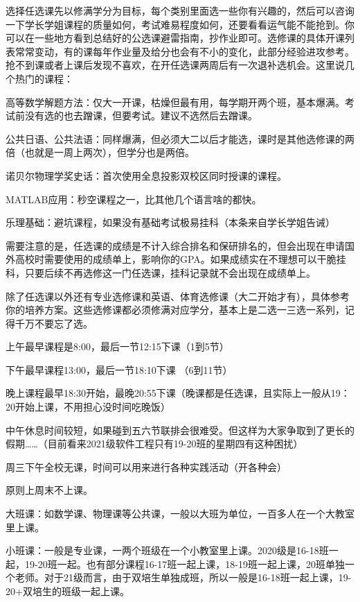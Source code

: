 选择任选课先以修满学分为目标，每个类别里面选一些你有兴趣的，然后可以咨询一下学长学姐课程的质量如何，考试难易程度如何，还要看看运气能不能抢到。你可以在一些地方看到总结好的公选课避雷指南，抄作业即可。选修课的具体开课列表常常变动，有的课每年作业量及给分也会有不小的变化，此部分经验进攻参考。抢不到课或者上课后发现不喜欢，在开任选课两周后有一次退补选机会。这里说几个热门的课程：

高等数学解题方法：仅大一开课，枯燥但最有用，每学期开两个班，基本爆满。考试前没有选的也去蹭课，但要考试。建议不选然后去蹭课。

公共日语、公共法语：同样爆满，但必须大二以后才能选，课时是其他选修课的两倍（也就是一周上两次），但学分也是两倍。

诺贝尔物理学奖史话：首次使用全息投影双校区同时授课的课程。

MATLAB应用：秒空课程之一，比其他几个语言啥的都快。

乐理基础：避坑课程，如果没有基础考试极易挂科（本条来自学长学姐告诫）

需要注意的是，任选课的成绩是不计入综合排名和保研排名的，但会出现在申请国外高校时需要使用的成绩单上，影响你的GPA。如果成绩实在不理想可以干脆挂科，只要后续不再选修这一门任选课，挂科记录就不会出现在成绩单上。

除了任选课以外还有专业选修课和英语、体育选修课（大二开始才有），具体参考你的培养方案。这些选修课都必须修满对应学分，基本上是二选一三选一系列，记得千万不要忘了选。


上午最早课程是8:00，最后一节12:15下课（1到5节）

下午最早课程13:00，最后一节18:10下课 （6到11节）

晚上课程最早18:30开始，最晚20:55下课（晚课都是任选课，且实际上一般从19：20开始上课，不用担心没时间吃晚饭）

中午休息时间较短，如果碰到五六节联排会很难受。但这样为大家争取到了更长的假期……（目前看来2021级软件工程只有19-20班的星期四有这种困扰）

周三下午全校无课，时间可以用来进行各种实践活动（开各种会）

原则上周末不上课。


大班课：如数学课、物理课等公共课，一般以大班为单位，一百多人在一个大教室里上课。

小班课：一般是专业课，一两个班级在一个小教室里上课。2020级是16-18班一起，19-20班一起。也有部分课程16-17班一起上课，18-19班一起上课，20班单独一个老师。对于21级而言，由于双培生单独成班，所以一般是16-18班一起上课，19-20+双培生的班级一起上课。

